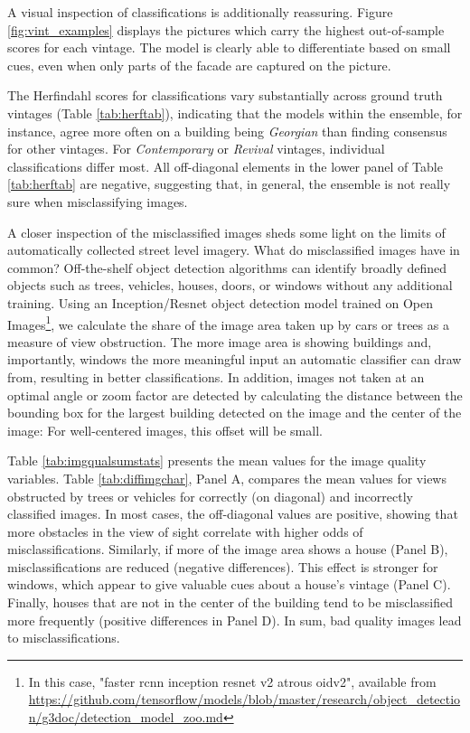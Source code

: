 \documentclass[]{article}
\let\rmarkdownfootnote\footnote%
\def\footnote{\protect\rmarkdownfootnote}
\begin{document}
A visual inspection of classifications is additionally reassuring.
Figure \ref{fig:vint_examples} displays the pictures which carry the
highest out-of-sample scores for each vintage. The model is clearly able
to differentiate based on small cues, even when only parts of the facade
are captured on the picture.

The Herfindahl scores for classifications vary substantially across
ground truth vintages (Table \ref{tab:herftab}), indicating that the
models within the ensemble, for instance, agree more often on a building
being \emph{Georgian} than finding consensus for other vintages. For
\emph{Contemporary} or \emph{Revival} vintages, individual
classifications differ most. All off-diagonal elements in the lower
panel of Table \ref{tab:herftab} are negative, suggesting that, in
general, the ensemble is not really sure when misclassifying images.

A closer inspection of the misclassified images sheds some light on the
limits of automatically collected street level imagery. What do
misclassified images have in common? Off-the-shelf object detection
algorithms can identify broadly defined objects such as trees, vehicles,
houses, doors, or windows without any additional training. Using an
Inception/Resnet object detection model trained on Open
Images\footnote{In this case, "faster rcnn inception resnet v2 atrous oidv2", available from \url{https://github.com/tensorflow/models/blob/master/research/object_detection/g3doc/detection_model_zoo.md}},
we calculate the share of the image area taken up by cars or trees as a
measure of view obstruction. The more image area is showing buildings
and, importantly, windows the more meaningful input an automatic
classifier can draw from, resulting in better classifications. In
addition, images not taken at an optimal angle or zoom factor are
detected by calculating the distance between the bounding box for the
largest building detected on the image and the center of the image: For
well-centered images, this offset will be small.

Table \ref{tab:imgqualsumstats} presents the mean values for the image
quality variables. Table \ref{tab:diffimgchar}, Panel A, compares the
mean values for views obstructed by trees or vehicles for correctly (on
diagonal) and incorrectly classified images. In most cases, the
off-diagonal values are positive, showing that more obstacles in the
view of sight correlate with higher odds of misclassifications.
Similarly, if more of the image area shows a house (Panel B),
misclassifications are reduced (negative differences). This effect is
stronger for windows, which appear to give valuable cues about a house's
vintage (Panel C). Finally, houses that are not in the center of the
building tend to be misclassified more frequently (positive differences
in Panel D). In sum, bad quality images lead to misclassifications.
\end{document}
